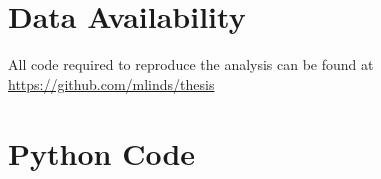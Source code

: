 \chapter{Data Availability}
All code required to reproduce the analysis can be found at \url{https://github.com/mlinds/thesis}

\chapter{Python Code}


